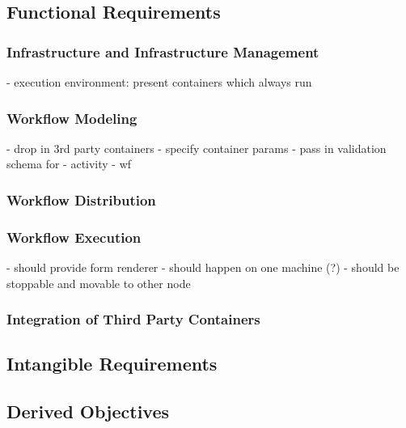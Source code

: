 
\subsection{Functional Requirements} %
  \label{sub:functional_requirements}

  \subsubsection{Infrastructure and Infrastructure Management} %
    \label{ssub:infrastructure_management}

        - execution environment: present containers which always run


  \subsubsection{Workflow Modeling} %
    \label{ssub:workflow_modeling}

        - drop in 3rd party containers
          - specify container params
        - pass in validation schema for
          - activity
          - wf

  \subsubsection{Workflow Distribution} %
    \label{ssub:workflow_distribution}

  \subsubsection{Workflow Execution} %
    \label{ssub:workflow_execution}

        - should provide form renderer
        - should happen on one machine (?)
        - should be stoppable and movable to other node

  \subsubsection{Integration of Third Party Containers} %
    \label{ssub:integration_of_third_party_containers}

\subsection{Intangible Requirements} %
  \label{sub:intangible_requirements}

\subsection{Derived Objectives} %
  \label{sub:derived_objectives}
